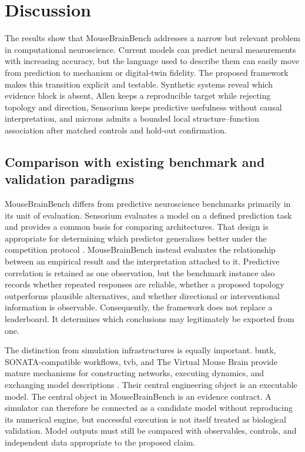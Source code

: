 \section{Discussion}
\label{sec:discussion}

The results show that MouseBrainBench addresses a narrow but relevant problem in
computational neuroscience. Current models can predict neural measurements with
increasing accuracy, but the language used to describe them can easily move from
prediction to mechanism or digital-twin fidelity. The proposed framework makes
this transition explicit and testable. Synthetic systems reveal which evidence
block is absent, Allen keeps a reproducible target while rejecting topology and
direction, Sensorium keeps predictive usefulness without causal interpretation,
and \acs{microns} admits a bounded local structure--function association after
matched controls and hold-out confirmation.

\subsection{Comparison with existing benchmark and validation paradigms}
\label{subsec:benchmark-comparison}

MouseBrainBench differs from predictive neuroscience benchmarks primarily in
its unit of evaluation. Sensorium evaluates a model on a defined prediction
task and provides a common basis for comparing architectures. That design is
appropriate for determining which predictor generalizes better under the
competition protocol \citep{willeke2022sensorium,turishcheva2023dynamic}.
MouseBrainBench instead evaluates the relationship between an empirical result
and the interpretation attached to it. Predictive correlation is retained as
one observation, but the benchmark instance also records whether repeated
responses are reliable, whether a proposed topology outperforms plausible
alternatives, and whether directional or interventional information is
observable. Consequently, the framework does not replace a leaderboard. It
determines which conclusions may legitimately be exported from one.

The distinction from simulation infrastructures is equally important. \acs{bmtk},
SONATA-compatible workflows, \acs{tvb}, and The Virtual Mouse Brain
provide mature mechanisms for constructing networks, executing dynamics, and
exchanging model descriptions \citep{dai2020bmtk,tvb2013,melozzi2017virtualmouse}.
Their central engineering object is an executable model. The central object in
MouseBrainBench is an evidence contract. A simulator can therefore be connected
as a candidate model without reproducing its numerical engine, but successful
execution is not itself treated as biological validation. Model outputs must
still be compared with observables, controls, and independent data appropriate
to the proposed claim.

